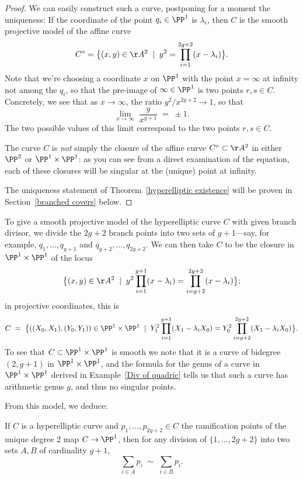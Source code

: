 \begin{proof} 
We can easily construct such a curve, postponing for a moment the uniqueness:
If the coordinate of the point $q_i \in \PP^1$ is $\lambda_i$, then $C$ is the smooth projective model of the affine curve 
  $$
C^\circ = \big\{ (x,y) \in \AA^2 \; \mid \; y^2 = \prod_{i=1}^{2g+2} (x - \lambda_i) \big\}.
$$ 
Note that we're choosing a coordinate $x$ on $\PP^1$ with the point $x = \infty$ at infinity not among the $q_i$, so that the pre-image of $\infty \in \PP^1$ is two points $r, s \in C$. Concretely, we see that as $x \to \infty$, the ratio $y^2/x^{2g+2} \to 1$, so that 
$$
\lim_{x \to \infty} \; \frac{y}{x^{g+1}} \; = \; \pm 1.
$$
  The two possible values of this limit correspond to the two points $r,s \in C$.
  
The curve $C$ is \emph{not} simply the closure of the affine curve $C^\circ \subset \AA^2$ in either $\PP^2$ or $\PP^1 \times \PP^1$: as you can see from a direct examination of the equation, each of these closures will be singular at the (unique) point at infinity.
  
The uniqueness statement of Theorem~\ref{hyperelliptic existence} will be proven in Section~\ref{branched covers} below.
 \end{proof}
To give a smooth projective model of the hyperelliptic curve $C$ with given branch divisor, we divide the $2g+2$ branch points  into two sets of $g+1$---say, for example, $q_1,\dots,q_{g+1}$ and $q_{g+2}, \dots, q_{2g+2}$. We can then take $C$ to be the closure in $\PP^1 \times \PP^1$ of the  locus
  $$
  \big\{ (x,y) \in \AA^2 \; \mid \; y^2\prod_{i=1}^{g+1} (x - \lambda_i) = \prod_{i=g+2}^{2g+2} (x - \lambda_i) \big\};
  $$
  in projective coordinates, this is
   $$
  C \; = \; \big\{ ((X_{0},X_{1}), (Y_{0},Y_{1})) \in \PP^1 \times \PP^1 \; \mid \; Y_1^2\prod_{i=1}^{g+1} (X_1 - \lambda_iX_0) = Y_0^2\prod_{i=g+2}^{2g+2} (X_1 - \lambda_iX_0) \big\}.
  $$
To see that $C \subset \PP^1 \times \PP^1$ is smooth we note that it is a curve of bidegree $(2,g+1)$ in $\PP^1 \times \PP^1$, and the formula for the genus of a curve in $\PP^1 \times \PP^1$ derived in Example~\ref{Div of quadric} tells us that such a curve has arithmetic genus $g$, and thus no singular points. 

From this model, we deduce:

\begin{corollary}\label{relation on ramification points}
If $C$ is a hyperelliptic curve  and $p_1,\dots,p_{2g+2} \in C$ the ramification points of the unique degree 2 map $C \to \PP^1$, then for any division of $\{1,\dots,2g+2\}$ into two sets $A,B$ of cardinality $g+1$,
$$
\sum_{i\in A} p_{i}  \; \sim \; \sum_{i\in B}p_{i}.
$$
\end{corollary}

